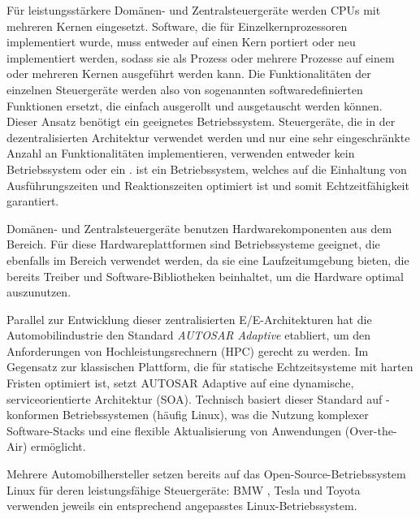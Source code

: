 Für leistungsstärkere Domänen- und Zentralsteuergeräte werden CPUs mit mehreren Kernen eingesetzt. Software, die für Einzelkernprozessoren implementiert wurde, muss entweder auf einen Kern portiert oder neu implementiert werden, sodass sie als Prozess oder mehrere Prozesse auf einem oder mehreren Kernen ausgeführt werden kann. \cite{Widlund2017} Die Funktionalitäten der einzelnen Steuergeräte werden also von sogenannten softwaredefinierten Funktionen ersetzt, die einfach ausgerollt und ausgetauscht werden können. Dieser Ansatz benötigt ein geeignetes Betriebssystem. Steuergeräte, die in der dezentralisierten Architektur verwendet werden und nur eine sehr eingeschränkte Anzahl an Funktionalitäten implementieren, verwenden entweder kein Betriebssystem oder ein .  ist ein Betriebssystem, welches auf die Einhaltung von Ausführungszeiten und Reaktionszeiten optimiert ist und somit Echtzeitfähigkeit garantiert. 

Domänen- und Zentralsteuergeräte benutzen Hardwarekomponenten aus dem  Bereich. Für diese Hardwareplattformen sind Betriebssysteme geeignet, die ebenfalls im  Bereich verwendet werden, da sie eine Laufzeitumgebung bieten, die bereits Treiber und Software-Bibliotheken beinhaltet, um die Hardware optimal auszunutzen.

Parallel zur Entwicklung dieser zentralisierten E/E-Architekturen hat die Automobilindustrie den Standard \textit{AUTOSAR Adaptive} etabliert, um den Anforderungen von Hochleistungsrechnern (HPC) gerecht zu werden. \cite{Tischer2018} Im Gegensatz zur klassischen Plattform, die für statische Echtzeitsysteme mit harten Fristen optimiert ist, setzt AUTOSAR Adaptive auf eine dynamische, serviceorientierte Architektur (\gls{SOA}). \cite{AUTOSAR2023} Technisch basiert dieser Standard auf -konformen Betriebssystemen (häufig Linux), was die Nutzung komplexer Software-Stacks und eine flexible Aktualisierung von Anwendungen (Over-the-Air) ermöglicht. \cite{Huang2022}

Mehrere Automobilhersteller setzen bereits auf das Open-Source-Betriebssystem Linux für deren leistungsfähige Steuergeräte: BMW \cite{Foss2019}, Tesla \cite{Tesla2024} und Toyota \cite{endgadget2017} verwenden jeweils ein entsprechend angepasstes Linux-Betriebssystem.

